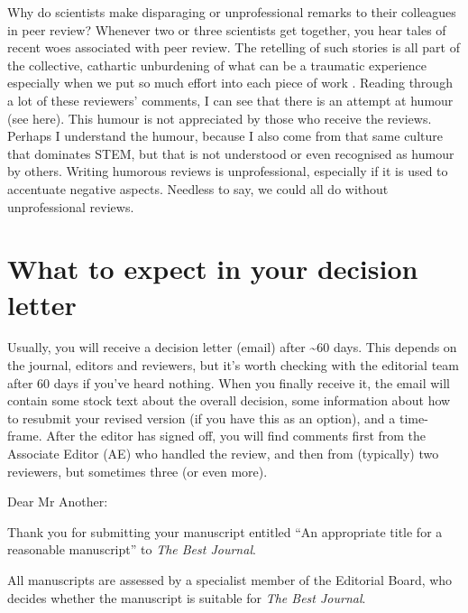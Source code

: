 \documentclass[
]{krantz}
\renewenvironment{quote}{\begin{VF}}{\end{VF}}
\begin{document}
Why do scientists make disparaging or unprofessional remarks to their colleagues in peer review? Whenever two or three scientists get together, you hear tales of recent woes associated with peer review. The retelling of such stories is all part of the collective, cathartic unburdening of what can be a traumatic experience especially when we put so much effort into each piece of work \citep[see][]{hyland2020this}. Reading through a lot of these reviewers' comments, I can see that there is an attempt at humour (see here). This humour is not appreciated by those who receive the reviews. Perhaps I understand the humour, because I also come from that same culture that dominates STEM, but that is not understood or even recognised as humour by others. Writing humorous reviews is unprofessional, especially if it is used to accentuate negative aspects. Needless to say, we could all do without unprofessional reviews.

\hypertarget{what-to-expect-in-your-decision-letter}{%
\section{What to expect in your decision letter}\label{what-to-expect-in-your-decision-letter}}

Usually, you will receive a decision letter (email) after \textasciitilde60 days. This depends on the journal, editors and reviewers, but it's worth checking with the editorial team after 60 days if you've heard nothing. When you finally receive it, the email will contain some stock text about the overall decision, some information about how to resubmit your revised version (if you have this as an option), and a time-frame. After the editor has signed off, you will find comments first from the Associate Editor (AE) who handled the review, and then from (typically) two reviewers, but sometimes three (or even more).

\begin{quote}
Dear Mr Another:
\end{quote}

\begin{quote}
Thank you for submitting your manuscript entitled ``An appropriate title for a reasonable manuscript'' to \emph{The Best Journal}.
\end{quote}

\begin{quote}
All manuscripts are assessed by a specialist member of the Editorial Board, who decides whether the manuscript is suitable for \emph{The Best Journal}.
\end{quote}
\end{document}
